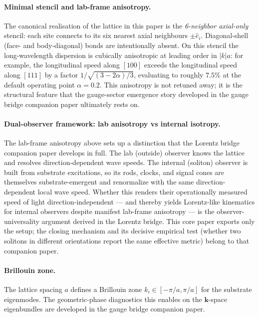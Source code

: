 \paragraph{Minimal stencil and lab-frame anisotropy.}
The canonical realisation of the lattice in this paper is the \emph{6-neighbor axial-only} stencil:
each site connects to its six nearest axial neighbours $\pm\hat{e}_i$.
Diagonal-shell (face- and body-diagonal) bonds are intentionally absent.
On this stencil the long-wavelength dispersion is cubically anisotropic at leading order in $|k|a$:
for example, the longitudinal speed along $[100]$ exceeds the longitudinal speed along $[111]$
by a factor $1/\sqrt{(3-2\alpha)/3}$, evaluating to roughly $7.5\%$ at the default operating point $\alpha=0.2$.
This anisotropy is not retuned away; it is the structural feature that the gauge-sector emergence story developed in the gauge bridge companion paper ultimately rests on.

\paragraph{Dual-observer framework: lab anisotropy vs internal isotropy.}
\label{para:dual-observer}
The lab-frame anisotropy above sets up a distinction that the Lorentz bridge companion paper develops in full.
The lab (outside) observer knows the lattice and resolves direction-dependent wave speeds.
The internal (soliton) observer is built from substrate excitations, so its rods, clocks, and signal cones are
themselves substrate-emergent and renormalize with the same direction-dependent local wave speed.
Whether this renders their operationally measured speed of light direction-independent --- and thereby yields
Lorentz-like kinematics for internal observers despite manifest lab-frame anisotropy --- is the observer-universality
argument derived in the Lorentz bridge.
This core paper exports only the setup; the closing mechanism and its decisive empirical test (whether two solitons in
different orientations report the same effective metric) belong to that companion paper.

\paragraph{Brillouin zone.}
The lattice spacing $a$ defines a Brillouin zone $k_i\in[-\pi/a,\pi/a]$ for the substrate eigenmodes.
The geometric-phase diagnostics this enables on the $\mathbf{k}$-space eigenbundles are developed in the gauge bridge
companion paper.


